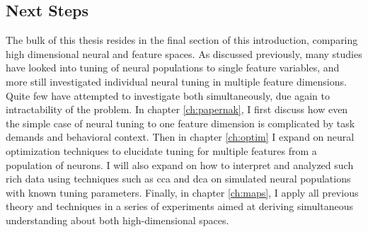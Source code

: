 \subsection{Next Steps}
The bulk of this thesis resides in the final section of this introduction, comparing high dimensional neural and feature spaces. As discussed previously, many studies have looked into tuning of neural populations to single feature variables, and more still investigated individual neural tuning in multiple feature dimensions. Quite few have attempted to investigate both simultaneously, due again to intractability of the problem. 
In chapter \ref{ch:papernak}, I first discuss how even the simple case of neural tuning to one feature dimension is complicated by task demands and behavioral context. Then in chapter \ref{ch:optim} I expand on neural optimization techniques to elucidate tuning for multiple features from a population of neurons. I will also expand on how to interpret and analyzed such rich data using techniques such as \gls{cca} and \gls{dca} on simulated neural populations with known tuning parameters. Finally, in chapter \ref{ch:maps}, I apply all previous theory and techniques in a series of experiments aimed at deriving simultaneous understanding about both high-dimensional spaces. 






